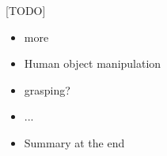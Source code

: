 [TODO]
\begin{itemize}
\item more
\item Human object manipulation
\item grasping?
\item ...
\item Summary at the end
\end{itemize}

%		
